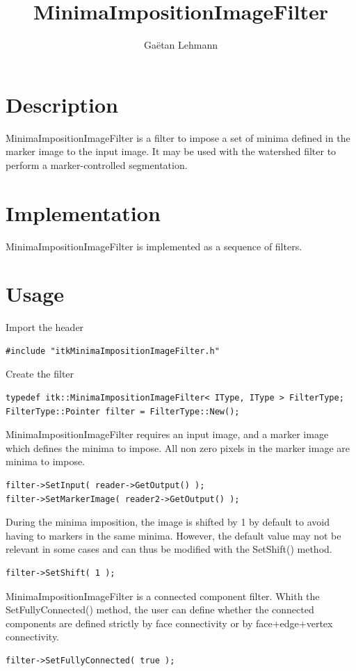 \documentclass[IJ]{cesj}
\author{Ga\"etan Lehmann}
\institute{Biologie du d\'eveloppement et de la reproduction, INRA de Jouy-en-Josas}
\title{MinimaImpositionImageFilter}
\begin{document}
\lstset{language=c++}
\maketitle

\section{Description}
MinimaImpositionImageFilter is a filter to impose a set of minima defined in the marker image to the input image. It may be used with the watershed filter to perform a marker-controlled segmentation.

\section{Implementation}
MinimaImpositionImageFilter is implemented as a sequence of filters.

\section{Usage}
Import the header
\begin{lstlisting}
#include "itkMinimaImpositionImageFilter.h"
\end{lstlisting}
Create the filter
\begin{lstlisting}
typedef itk::MinimaImpositionImageFilter< IType, IType > FilterType;
FilterType::Pointer filter = FilterType::New();
\end{lstlisting}
MinimaImpositionImageFilter requires an input image, and a marker image which defines the minima to impose. All non zero pixels in the marker image are minima to impose.
\begin{lstlisting}
filter->SetInput( reader->GetOutput() );
filter->SetMarkerImage( reader2->GetOutput() );
\end{lstlisting}
During the minima imposition, the image is shifted by 1 by default to avoid having to markers in the same minima. However, the default value may not be relevant in some cases and can thus be modified with the SetShift() method.
\begin{lstlisting}
filter->SetShift( 1 );
\end{lstlisting}
MinimaImpositionImageFilter is a connected component filter. Whith the SetFullyConnected() method, the user can define whether the connected components are defined strictly by face connectivity or by face+edge+vertex connectivity.
\begin{lstlisting}
filter->SetFullyConnected( true );
\end{lstlisting}
\end{document}
